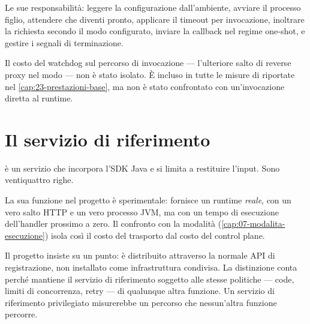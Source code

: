 Le sue responsabilit\`a: leggere la configurazione dall'ambiente, avviare il
processo figlio, attendere che diventi pronto, applicare il timeout per
invocazione, inoltrare la richiesta secondo il modo configurato, inviare la
callback nel regime one-shot, e gestire i segnali di terminazione.

\begin{damisurare}
Il costo del watchdog sul percorso di invocazione --- l'ulteriore salto di
reverse proxy nel modo  --- non \`e stato isolato. \`E incluso in
tutte le misure di  riportate nel
\cref{cap:23-prestazioni-base}, ma non \`e stato confrontato con un'invocazione
diretta al runtime.
\end{damisurare}

\section{Il servizio di riferimento }

 \`e un servizio che incorpora l'SDK Java e si
limita a restituire l'input. Sono ventiquattro righe.

La sua funzione nel progetto \`e sperimentale: fornisce un runtime \emph{reale},
con un vero salto HTTP e un vero processo JVM, ma con un tempo di esecuzione
dell'handler prossimo a zero. Il confronto con la modalit\`a 
(\cref{cap:07-modalita-esecuzione}) isola cos\`i il costo del trasporto dal costo
del control plane.

Il progetto insiste su un punto:  \`e distribuito attraverso la
normale API di registrazione, non installato come infrastruttura condivisa. La
distinzione conta perch\'e mantiene il servizio di riferimento soggetto alle
stesse politiche --- code, limiti di concorrenza, retry --- di qualunque altra
funzione. Un servizio di riferimento privilegiato misurerebbe un percorso che
nessun'altra funzione percorre.
